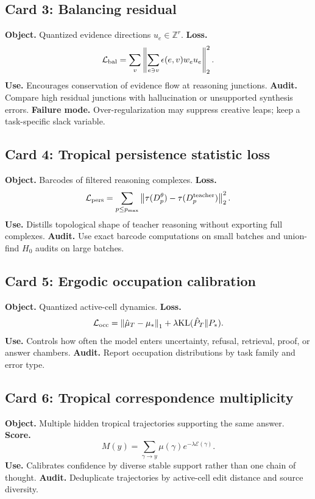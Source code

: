 \documentclass[11pt]{article}
\newcommand{\Z}{\mathbb{Z}}
\newcommand{\calE}{\mathcal{E}}
\newcommand{\calL}{\mathcal{L}}
\newcommand{\norm}[1]{\left\lVert #1\right\rVert}
\begin{document}
\subsection*{Card 3: Balancing residual}
\textbf{Object.}  Quantized evidence directions \(u_e\in\Z^r\).  \textbf{Loss.}
\begin{equation}
\calL_{\rm bal}=\sum_v\norm{\sum_{e\ni v}\epsilon(e,v)w_eu_e}_2^2.
\end{equation}
\textbf{Use.}  Encourages conservation of evidence flow at reasoning junctions.  \textbf{Audit.}  Compare high residual junctions with hallucination or unsupported synthesis errors.  \textbf{Failure mode.}  Over-regularization may suppress creative leaps; keep a task-specific slack variable.

\subsection*{Card 4: Tropical persistence statistic loss}
\textbf{Object.}  Barcodes of filtered reasoning complexes.  \textbf{Loss.}
\begin{equation}
\calL_{\rm pers}=\sum_{p\le p_{\max}}\norm{\tau(D_p^\theta)-\tau(D_p^{\rm teacher})}_2^2.
\end{equation}
\textbf{Use.}  Distills topological shape of teacher reasoning without exporting full complexes.  \textbf{Audit.}  Use exact barcode computations on small batches and union-find \(H_0\) audits on large batches.

\subsection*{Card 5: Ergodic occupation calibration}
\textbf{Object.}  Quantized active-cell dynamics.  \textbf{Loss.}
\begin{equation}
\calL_{\rm occ}=\norm{\hat\mu_T-\mu_*}_1+\lambda\mathrm{KL}(\hat P_T\Vert P_*).
\end{equation}
\textbf{Use.}  Controls how often the model enters uncertainty, refusal, retrieval, proof, or answer chambers.  \textbf{Audit.}  Report occupation distributions by task family and error type.

\subsection*{Card 6: Tropical correspondence multiplicity}
\textbf{Object.}  Multiple hidden tropical trajectories supporting the same answer.  \textbf{Score.}
\begin{equation}
M(y)=\sum_{\gamma\to y}\mu(\gamma)e^{-\lambda\calE(\gamma)}.
\end{equation}
\textbf{Use.}  Calibrates confidence by diverse stable support rather than one chain of thought.  \textbf{Audit.}  Deduplicate trajectories by active-cell edit distance and source diversity.
\end{document}
